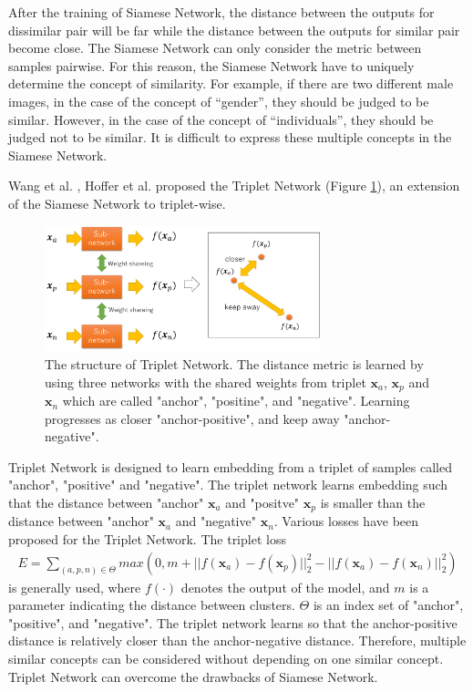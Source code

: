 \documentclass[a4paper,12pt]{article}
\begin{document}
After the training of Siamese Network, the distance between the outputs for dissimilar pair will be far while the distance between the outputs for similar pair become close.
The Siamese Network can only consider the metric between samples pairwise.
For this reason, the Siamese Network have to uniquely determine the concept of similarity.
For example, if there are two different male images, in the case of the concept of “gender”, they should be judged to be similar.
However, in the case of the concept of “individuals”, they should be judged not to be similar.
It is difficult to express these multiple concepts in the Siamese Network.

Wang et al. \cite{Wang2014}, Hoffer et al. \cite{Hoffer2015} proposed the Triplet Network (Figure \ref{fig:triplet}), an extension of the Siamese Network to triplet-wise.

\begin{figure}[ht]
\begin{center}
\includegraphics[width=80mm]{figure_triplet.png}
\caption{The structure of Triplet Network. The distance metric is learned by using three networks with the shared weights from triplet $\bm{x}_a$, $\bm{x}_p$ and $\bm{x}_n$ which are called "anchor", "positine", and "negative". Learning progresses as closer "anchor-positive", and keep away "anchor-negative".}
\label{fig:triplet}
\end{center}
\end{figure}

Triplet Network is designed to learn embedding from a triplet of samples called "anchor", "positive" and "negative".
The triplet network learns embedding such that the distance between "anchor" ${\bm x_a}$ and "positve" ${\bm x_p}$ is smaller than the distance between "anchor" ${\bm x_a}$ and "negative" ${\bm x_n}$.
Various losses have been proposed for the Triplet Network.
The triplet loss 
\begin{align} \label{eq:triplet}
    E=\sum_{(a,p,n) \in \Theta}max(0, m + ||f({\bm x_a})-f({\bm x_p})||_2^2 - ||f({\bm x_a}) - f({\bm x_n})||_2^2)
\end{align}
is generally used, 
where $f(\cdot)$ denotes the output of the model, and $m$ is a parameter indicating the distance between clusters.
$\Theta$ is an index set of "anchor", "positive", and "negative".
The triplet network learns so that the anchor-positive distance is relatively closer than the anchor-negative distance.
Therefore, multiple similar concepts can be considered without depending on one similar concept.
Triplet Network can overcome the drawbacks of Siamese Network.
\end{document}
